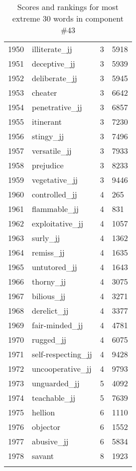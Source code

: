 \begin{longtable}[!htbp]{| rlr@{.}l |}
    1950 & illiterate\_jj & 3 & 5918 \\
    1951 & deceptive\_jj & 3 & 5939 \\
    1952 & deliberate\_jj & 3 & 5945 \\
    1953 & cheater & 3 & 6642 \\
    1954 & penetrative\_jj & 3 & 6857 \\
    1955 & itinerant & 3 & 7230 \\
    1956 & stingy\_jj & 3 & 7496 \\
    1957 & versatile\_jj & 3 & 7933 \\
    1958 & prejudice & 3 & 8233 \\
    1959 & vegetative\_jj & 3 & 9446 \\
    1960 & controlled\_jj & 4 & 265 \\
    1961 & flammable\_jj & 4 & 831 \\
    1962 & exploitative\_jj & 4 & 1057 \\
    1963 & surly\_jj & 4 & 1362 \\
    1964 & remiss\_jj & 4 & 1635 \\
    1965 & untutored\_jj & 4 & 1643 \\
    1966 & thorny\_jj & 4 & 3075 \\
    1967 & bilious\_jj & 4 & 3271 \\
    1968 & derelict\_jj & 4 & 3377 \\
    1969 & fair-minded\_jj & 4 & 4781 \\
    1970 & rugged\_jj & 4 & 6075 \\
    1971 & self-respecting\_jj & 4 & 9428 \\
    1972 & uncooperative\_jj & 4 & 9793 \\
    1973 & unguarded\_jj & 5 & 4092 \\
    1974 & teachable\_jj & 5 & 7639 \\
    1975 & hellion & 6 & 1110 \\
    1976 & objector & 6 & 1552 \\
    1977 & abusive\_jj & 6 & 5834 \\
    1978 & savant & 8 & 1923 \\
    \hline
    \caption{Scores and rankings for most extreme 30 words in component \#43} \\
\end{longtable}
